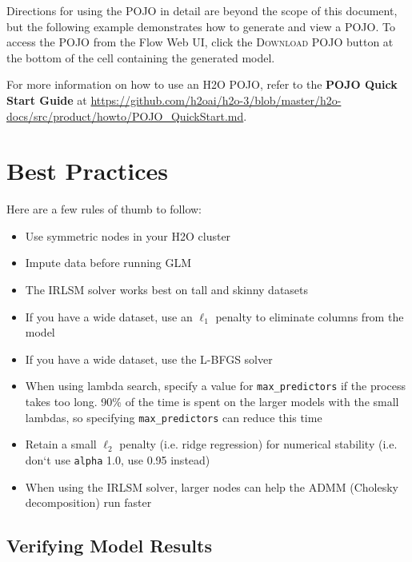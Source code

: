Directions for using the POJO in detail are beyond the scope of this document, but the following example demonstrates how to generate and view a POJO.  To access the POJO from the Flow Web UI, click the \textsc{Download POJO} button at the bottom of the cell containing the generated model.

For more information on how to use an H2O POJO, refer to the \textbf{POJO Quick Start Guide} at {\url{https://github.com/h2oai/h2o-3/blob/master/h2o-docs/src/product/howto/POJO_QuickStart.md}}. 

\waterExampleInR

\waterExampleInPython



\section{Best Practices}

Here are a few rules of thumb to follow:

\begin{itemize}
\item Use symmetric nodes in your H2O cluster
\item Impute data before running GLM
\item The IRLSM solver works best on tall and skinny datasets
\item If you have a wide dataset, use an  $\ell_1$ penalty to eliminate columns from the model
\item If you have a wide dataset, use the L-BFGS solver
\item When using lambda search, specify a value for \texttt{max\_predictors} if the process takes too long. 90\% of the time is spent on the larger models with the small lambdas, so specifying \texttt{max\_predictors} can reduce this time
\item Retain a small  $\ell_2$ penalty (i.e. ridge regression) for numerical stability (i.e. don`t use \texttt{alpha} 1.0, use 0.95 instead)
\item When using the IRLSM solver, larger nodes can help the ADMM (Cholesky decomposition) run faster
\end{itemize}

\subsection{Verifying Model Results}

